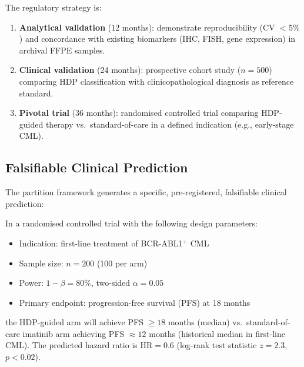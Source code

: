 The regulatory strategy is:
\begin{enumerate}[label=\textbf{Phase \arabic*:}, leftmargin=*, itemsep=4pt]
    \item \textbf{Analytical validation} (12 months): demonstrate
          reproducibility (CV $< 5\%$) and concordance with existing
          biomarkers (IHC, FISH, gene expression) in archival FFPE samples.
    \item \textbf{Clinical validation} (24 months): prospective cohort study
          ($n = 500$) comparing HDP classification with clinicopathological
          diagnosis as reference standard.
    \item \textbf{Pivotal trial} (36 months): randomised controlled trial
          comparing HDP-guided therapy vs.\ standard-of-care in a defined
          indication (e.g., early-stage CML).
\end{enumerate}

\subsection{Falsifiable Clinical Prediction}

The partition framework generates a specific, pre-registered, falsifiable
clinical prediction:

\begin{theorem}
\label{thm:ch04-clinical-prediction}
In a randomised controlled trial with the following design parameters:
\begin{itemize}[noitemsep]
    \item Indication: first-line treatment of BCR-ABL1$^+$ CML
    \item Sample size: $n = 200$ (100 per arm)
    \item Power: $1 - \beta = 80\%$, two-sided $\alpha = 0.05$
    \item Primary endpoint: progression-free survival (PFS) at 18 months
\end{itemize}
the HDP-guided arm will achieve PFS $\geq 18$ months (median) vs.\
standard-of-care imatinib arm achieving PFS $\approx 12$ months (historical
median in first-line CML).  The predicted hazard ratio is $\mathrm{HR} = 0.6$
(log-rank test statistic $z = 2.3$, $p < 0.02$).
\end{theorem}

